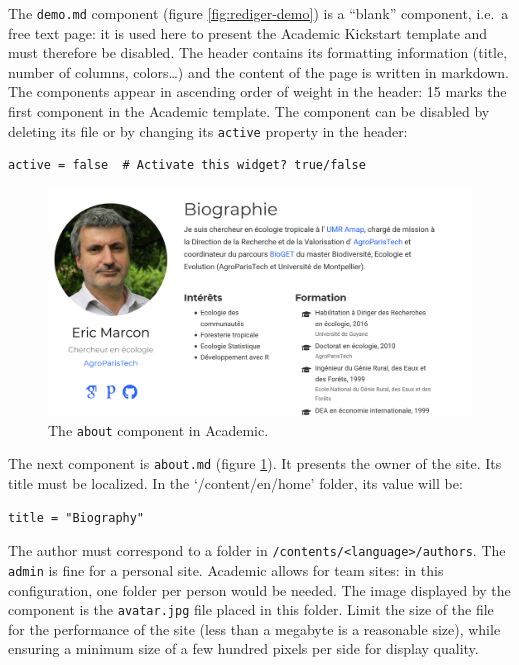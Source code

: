 \documentclass[
  12pt,
  american,
  a4paper,
  extrafontsizes,onecolumn,openright
  ]{memoir}
\newlength{\rf}
\begin{document}
\normalsize

The \texttt{demo.md} component (figure \ref{fig:rediger-demo}) is a \enquote{blank} component, i.e.~a free text page: it is used here to present the Academic Kickstart template and must therefore be disabled.
The header contains its formatting information (title, number of columns, colors\ldots) and the content of the page is written in markdown.
The components appear in ascending order of weight in the header: 15 marks the first component in the Academic template.
The component can be disabled by deleting its file or by changing its \texttt{active} property in the header:

\begin{verbatim}
active = false  # Activate this widget? true/false
\end{verbatim}



\scriptsize

\begin{figure}

{\centering \includegraphics[width=0.8\linewidth]{images/rediger-about} 

}

\caption{The \texttt{about} component in Academic.}\label{fig:rediger-about}
\end{figure}

\normalsize

The next component is \texttt{about.md} (figure \ref{fig:rediger-about}).
It presents the owner of the site.
Its title must be localized.
In the `/content/en/home' folder, its value will be:

\begin{verbatim}
title = "Biography"
\end{verbatim}

The author must correspond to a folder in \texttt{/contents/\textless{}language\textgreater{}}\break\texttt{/authors}.
The \texttt{admin} is fine for a personal site.
Academic allows for team sites: in this configuration, one folder per person would be needed.
The image displayed by the component is the \texttt{avatar.jpg} file placed in this folder.
Limit the size of the file for the performance of the site (less than a megabyte is a reasonable size), while ensuring a minimum size of a few hundred pixels per side for display quality.
\end{document}
